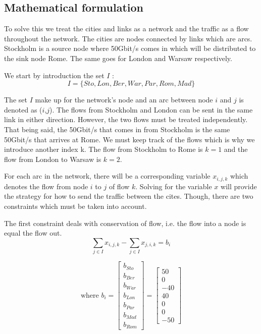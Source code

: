 \subsection{Mathematical formulation}
To solve this we treat the cities and links as a network and the traffic as a flow throughout the network. The cities are nodes connected by links which are arcs. Stockholm is a source node where 50Gbit/s comes in which will be distributed to the sink node Rome. The same goes for London and Warsaw respectively.

We start by introduction the set $I$ :
$$I = \{ Sto,Lon,Ber,War,Par,Rom,Mad\}$$

The set $I$ make up for the network's node and an arc between node $i$ and $j$ is denoted as ($i$,$j$). The flows from Stockholm and London can be sent in the same link in either direction. However, the two flows must be treated independently. That being said, the 50Gbit/s that comes in from Stockholm is the same 50Gbit/s that arrives at Rome. We must keep track of the flows which is why we introduce another index k. The flow from Stockholm to Rome is $k=1$ and the flow from London to Warsaw is $k=2$.

For each arc in the network, there will be a corresponding variable $x_{i,j,k}$ which denotes the flow from node $i$ to $j$ of flow $k$. Solving for the variable $x$ will provide the strategy for how to send the traffic between the cites. Though, there are two constraints which must be taken into account. 

The first constraint deals with conservation of flow, i.e. the flow into a node is equal the flow out.
$$\sum\limits_{j \in I} x_{i,j,k} - \sum\limits_{j \in I} x_{j,i,k} = b_{i}$$

$$
\text{where } b_{i} = 
 \begin{bmatrix}
  b_{Sto}\\
  b_{Ber}\\
  b_{War}\\
  b_{Lon}\\
  b_{Par}\\
  b_{Mad}\\
  b_{Rom}
 \end{bmatrix} =
 \begin{bmatrix}
  50\\
  0\\
  -40\\
  40\\
  0\\
  0\\
  -50
 \end{bmatrix}
$$


